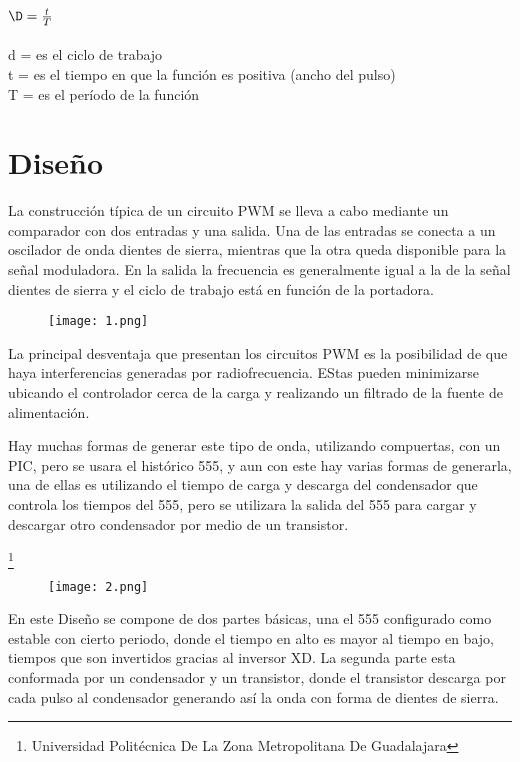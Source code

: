 \documentclass[11pt,a4paper]{article}
\begin{document}
{\huge $ \D = \frac{t}{T} $\\}\\
d = es el ciclo de trabajo\\
t = es el tiempo en que la función es positiva (ancho del pulso)\\
T = es el período de la función\\

\section{Diseño}

La construcción típica de un circuito PWM se lleva a cabo mediante un comparador con dos entradas y una salida. Una de las entradas se conecta a un oscilador de onda dientes de sierra, mientras que la otra queda disponible para la señal moduladora. En la salida la frecuencia es generalmente igual a la de la señal dientes de sierra y el ciclo de trabajo está en función de la portadora.\\

\begin{figure}[hbtp]
\centering
\texttt{[image: 1.png]}
\end{figure} 

La principal desventaja que presentan los circuitos PWM es la posibilidad de que haya interferencias generadas por radiofrecuencia. EStas pueden minimizarse ubicando el controlador cerca de la carga y realizando un filtrado de la fuente de alimentación.


Hay muchas formas de generar este tipo de onda, utilizando compuertas, con un PIC, pero se usara el histórico 555, y aun con este hay varias formas de generarla, una de ellas es utilizando el tiempo de carga y descarga del condensador que controla los tiempos del 555, pero se utilizara la salida del 555 para cargar y descargar otro condensador por medio de un transistor.

\footnote{Universidad Politécnica De La Zona Metropolitana De Guadalajara} 

\newpage

\begin{figure}[hbtp]
\centering
\texttt{[image: 2.png]}
\end{figure} 

En este Diseño se compone de dos partes básicas, una el 555 configurado como estable con cierto periodo, donde el tiempo en alto es mayor al tiempo en bajo, tiempos que son invertidos gracias al inversor XD.
La segunda parte esta conformada por un condensador y un transistor, donde el transistor descarga por cada pulso al condensador generando así la onda con forma de dientes de sierra. 
\end{document}
